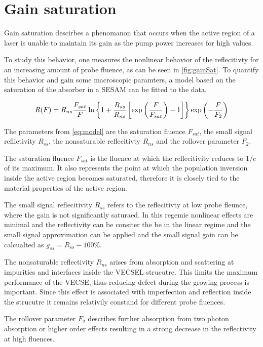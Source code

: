 \section{Gain saturation}

Gain saturation descirbes a phenomanon that occurs when the active region of a laser is unable to maintain its gain as the pump power increases for high values. 

To study this behavior, one measures the nonlinear behavior of the reflecitivty for an increasing amount of probe fluence, as can be seen in \cref{fig:gainSat}. To quantify this behavior and gain some macroscopic paramters, a model based on the saturation of the absorber in a SESAM can be fitted to the data. 

\begin{equation}
    \centering
    R(F)=R_{ns} \frac{F_{sat}}{F} \ln\left\{1 + \frac{R_{ss}}{R_{ns}} \left[\exp{ \left(\frac{F}{F_{sat}}\right) } - 1\right]\right\} \exp{\left(-\frac{F}{F_2}\right)}
    \label{eq:model}
\end{equation}

The parameters from \cref{eq:model} are the saturation fluence $F_{sat}$, the small signal reflictivity $R_{ss}$, the nonsaturable reflecitivty $R_{ns}$ and the rollover parameter $F_{2}$.

The saturation fluence $F_{sat}$ is the fluence at which the reflecitivity reduces to $1/e$ of its maximum. It also represents the point at which the population inversion inside the active region becomes saturated, therefore it is closely tied to the material properties of the active region.

The small signal reflecitivity $R_{ss}$ refers to the reflecitivty at low probe fleunce, where the gain is not significantly saturaed. In this regemie nonlinear effects are minimal and the reflectivity can be consiter the be in the linear regime and the small signal approximation can be applied and the small signal gain can be calcualted as $g_{ss}=R_{ss}-100\%$.

The nonsaturable reflectivity $R_{ns}$ arises from absorption and scattering at impurities and interfaces inside the VECSEL strucutre. This limits the maximum performance of the VECSE, thus reducing defect during the growing process is important. Since this effect is associated with imperfection and reflection inside the strucutre it remains relativily constand for different probe fluences. 

The rollover parameter $F_2$ describes further absorption from two photon absorption or higher order effects resulting in a strong decrease in the reflectivity at high fluences.

